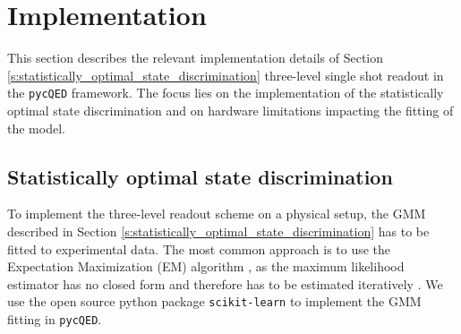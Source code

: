 \section{Implementation} \label{s:implementation}
This section describes the relevant implementation details of Section \ref{s:statistically_optimal_state_discrimination} three-level single shot readout in the \texttt{pycQED} framework. The focus lies on the implementation of the statistically optimal state discrimination and on hardware limitations impacting the fitting of the model.

\subsection{Statistically optimal state discrimination}
To implement the three-level readout scheme on a physical setup, the GMM described in Section \ref{s:statistically_optimal_state_discrimination} has to be fitted to experimental data. The most common approach is to use the Expectation Maximization (EM) algorithm \cite{Bishop2006}, as the maximum likelihood estimator has no closed form and therefore has to be estimated iteratively \cite[p.~434-439]{Bishop2006}. We use the open source python package \texttt{scikit-learn}  \cite{scikit-learn}  to implement the GMM fitting in \texttt{pycQED}. 

